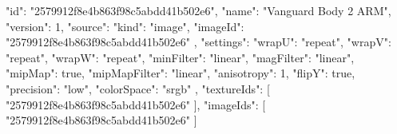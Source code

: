 {
  "id": "2579912f8e4b863f98c5abdd41b502e6",
  "name": "Vanguard Body 2 ARM",
  "version": 1,
  "source": {
    "kind": "image",
    "imageId": "2579912f8e4b863f98c5abdd41b502e6"
  },
  "settings": {
    "wrapU": "repeat",
    "wrapV": "repeat",
    "wrapW": "repeat",
    "minFilter": "linear",
    "magFilter": "linear",
    "mipMap": true,
    "mipMapFilter": "linear",
    "anisotropy": 1,
    "flipY": true,
    "precision": "low",
    "colorSpace": "srgb"
  },
  "textureIds": [
    "2579912f8e4b863f98c5abdd41b502e6"
  ],
  "imageIds": [
    "2579912f8e4b863f98c5abdd41b502e6"
  ]
}
